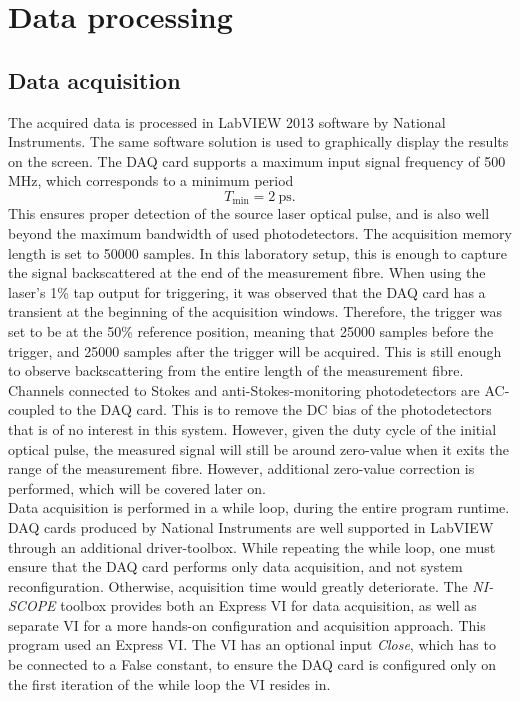 \documentclass{standalone}
\begin{document}
\chapter{Data processing}
\setcounter{page}\thestranica


\section{Data acquisition}

The acquired data is processed in LabVIEW 2013 software by National Instruments. The same software solution is used to graphically display the results on the screen. The DAQ card supports a maximum input signal frequency of 500 MHz, which corresponds to a minimum period
\begin{equation}
T_\textrm{min} = \SI{2}{\pico \second} \textrm{.}
\end{equation}
This ensures proper detection of the source laser optical pulse, and is also well beyond the maximum bandwidth of used photodetectors. The acquisition memory length is set to 50000 samples. In this laboratory setup, this is enough to capture the signal backscattered at the end of the measurement fibre. When using the laser's 1\% tap output for triggering, it was observed that the DAQ card has a transient at the beginning of the acquisition windows. Therefore, the trigger was set to be at the 50\% reference position, meaning that 25000 samples before the trigger, and 25000 samples after the trigger will be acquired. This is still enough to observe backscattering from the entire length of the measurement fibre. Channels connected to Stokes and anti-Stokes-monitoring photodetectors are AC-coupled to the DAQ card. This is to remove the DC bias of the photodetectors that is of no interest in this system. However, given the duty cycle of the initial optical pulse, the measured signal will still be around zero-value when it exits the range of the measurement fibre. However, additional zero-value correction is performed, which will be covered later on. \\

Data acquisition is performed in a while loop, during the entire program runtime. DAQ cards produced by National Instruments are well supported in LabVIEW through an additional driver-toolbox. While repeating the while loop, one must ensure that the DAQ card performs only data acquisition, and not system reconfiguration. Otherwise, acquisition time would greatly deteriorate. The \textit{NI-SCOPE} toolbox provides both an Express VI for data acquisition, as well as separate VI for a more hands-on configuration and acquisition approach. This program used an Express VI. The VI has an optional input \textit{Close}, which has to be connected to a False constant, to ensure the DAQ card is configured only on the first iteration of the while loop the VI resides in. \\
\end{document}
